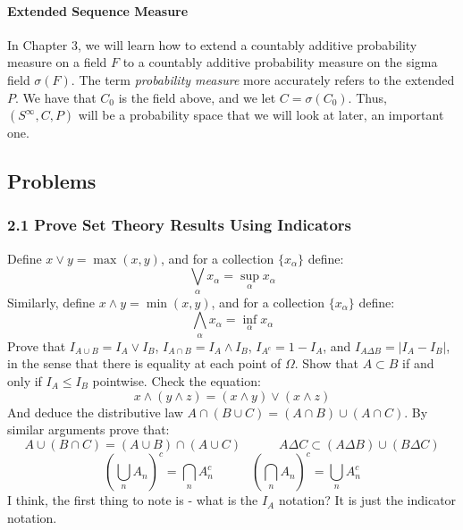 \documentclass[12pt,a4paper]{article}
\newcommand{\1}[1]{\mathbbm{1}\left\{ #1 \right\}}
\begin{document}
\paragraph{Extended Sequence Measure} In Chapter 3, we will learn how to extend a countably additive probability measure on a field $F$ to a countably additive probability measure on the sigma field $\sigma(F)$. The term \textit{probability measure} more accurately refers to the extended $P$. We have that $C_0$ is the field above, and we let $C = \sigma(C_0)$. Thus, $(S^\infty, C, P)$ will be a probability space that we will look at later, an important one.

\subsection{Problems}
\subsubsection{2.1 Prove Set Theory Results Using Indicators} Define $x \vee y = \max(x,y)$, and for a collection $\{x_\alpha\}$ define:
$$
	\bigvee_\alpha x_\alpha = \sup_\alpha x_\alpha
$$
Similarly, define $x \wedge y = \min(x,y)$, and for a collection $\{x_\alpha\}$ define:
$$
	\bigwedge_\alpha x_\alpha = \inf_\alpha x_\alpha
$$
Prove that $I_{A \cup B} = I_A \vee I_B$, $I_{A \cap B} = I_A \wedge I_B$, $I_{A^c} = 1 - I_A$, and $I_{A \Delta B} = |I_A - I_B|$, in the sense that there is equality at each point of $\Omega$. Show that $A \subset B$ if and only if $I_A \leq I_B$ pointwise. Check the equation:
$$
	x \wedge (y \wedge z) = (x \wedge y) \vee (x \wedge z)
$$
And deduce the distributive law $A \cap (B \cup C) = (A \cap B) \cup (A \cap C)$. By similar arguments prove that:
$$
	A \cup (B \cap C) = (A \cup B) \cap (A \cup C)
	\quad\quad\quad
	A \Delta C \subset (A \Delta B) \cup (B \Delta C)
$$
$$
	\left(\bigcup_n A_n\right)^c = \bigcap_n A_n^c
	\quad\quad\quad
	\left(\bigcap_n A_n\right)^c = \bigcup_n A_n^c
$$
I think, the first thing to note is - what is the $I_A$ notation? It is just the indicator notation.
\end{document}
